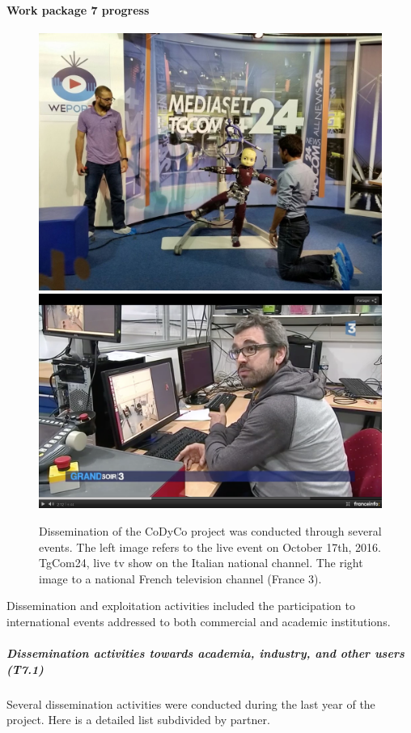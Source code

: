 

\paragraph{Work package 7 progress}

\begin{figure}
  \centering
    \includegraphics[width=.45\columnwidth]{images/tg24}
    \hspace{1cm}
    \includegraphics[width=.45\columnwidth]{images/vincent_dissemination}
  \caption{Dissemination of the CoDyCo project was conducted through several events. The left image refers to the
  live event on October 17th, 2016. TgCom24, live tv show on the Italian national channel. The right image
  to a national French television channel (France 3). }
 \label{fig:schemeAlgorithm4}
\end{figure}


Dissemination and exploitation activities included the participation to international events addressed to both commercial and academic institutions. 

\subparagraph{Dissemination activities towards academia, industry, and other users (T7.1)}

Several dissemination activities were conducted during the last year of the project. Here is a
detailed list subdivided by partner.

